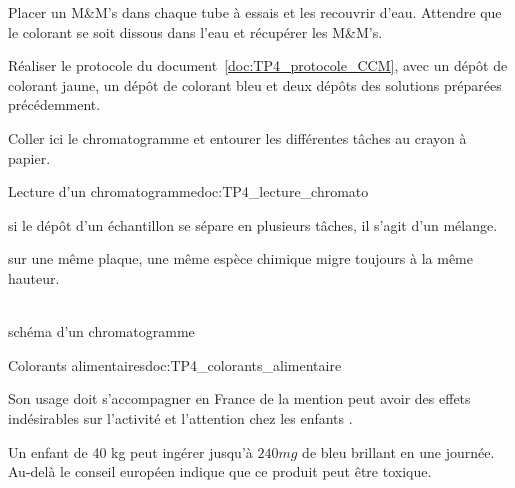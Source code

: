 \mesure
Placer un M\&M's dans chaque tube à essais et les recouvrir d'eau.
Attendre que le colorant se soit dissous dans l'eau et récupérer les M\&M's.

\mesure
Réaliser le protocole du document~\ref{doc:TP4_protocole_CCM}, avec un dépôt de colorant jaune, un dépôt de colorant bleu et deux dépôts des solutions préparées précédemment.

\mesure
Coller ici le chromatogramme  et entourer les différentes tâches au crayon à papier.
\pasCorrection{\vspace*{9.25cm}}




\pasCorrection{\newpage}
\begin{doc}{Lecture d'un chromatogramme}{doc:TP4_lecture_chromato}
  \begin{multicols}{2}
    \begin{listePoints}
      \item {} si le dépôt d'un échantillon se sépare en plusieurs tâches, il s'agit d'un mélange.
      \item {} sur une même plaque, une même espèce chimique migre toujours à la même hauteur.
    \end{listePoints}
    \vfill \strut

    \centering
     \\
    \footnotesize{schéma d'un chromatogramme}
  \end{multicols}
\end{doc}

\begin{doc}{Colorants alimentaires}{doc:TP4_colorants_alimentaire}
  \begin{listePoints}
    \item {} Son usage doit s'accompagner en France de la mention \og peut avoir des effets indésirables sur l'activité et l'attention chez les enfants \fg.
    \item {} Un enfant de 40 kg peut ingérer jusqu'à $240\unit{mg}$ de bleu brillant en une journée. Au-delà le conseil européen indique que ce produit peut être toxique.
  \end{listePoints}
\end{doc}

